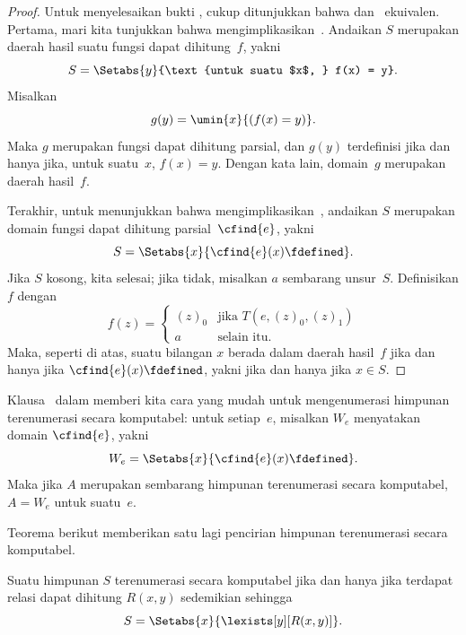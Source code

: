 \documentclass[../../../include/open-logic-section]{subfiles}
\begin{document}
\begin{proof}
Untuk menyelesaikan bukti , cukup ditunjukkan bahwa
 dan~ ekuivalen. Pertama, mari kita
tunjukkan bahwa  mengimplikasikan~.
Andaikan $S$ merupakan daerah hasil suatu fungsi dapat dihitung~$f$, yakni
\[
S = \Setabs{y}{\text{untuk suatu $x$, } f(x) = y}.
\]
Misalkan
\[
g(y) = \umin{x}{(f(x) = y)}.
\]
Maka $g$ merupakan fungsi dapat dihitung parsial, dan $g(y)$ terdefinisi jika
dan hanya jika, untuk suatu~$x$, $f(x) = y$. Dengan kata lain, domain~$g$
merupakan daerah hasil~$f$. 

Terakhir, untuk menunjukkan bahwa 
mengimplikasikan~, andaikan $S$ merupakan domain fungsi dapat
dihitung parsial~$\cfind{e}$, yakni
\[
S = \Setabs{x}{\cfind{e}(x) \fdefined}.
\]
Jika $S$ kosong, kita selesai; jika tidak, misalkan $a$ sembarang unsur~$S$.
Definisikan $f$ dengan
\[
f(z) = \begin{cases}
(z)_0 & \text{jika $T(e,(z)_0,(z)_1)$} \\
a & \text{selain itu.}
\end{cases}
\]
Maka, seperti di atas, suatu bilangan $x$ berada dalam daerah hasil~$f$ jika
dan hanya jika $\cfind{e}(x) \fdefined$, yakni jika dan hanya jika $x \in S$.
\end{proof}

Klausa~ dalam  memberi kita cara yang
mudah untuk mengenumerasi himpunan terenumerasi secara komputabel: untuk
setiap~$e$, misalkan $W_e$ menyatakan domain $\cfind{e}$, yakni
\[
W_e = \Setabs{x}{\cfind{e}(x) \fdefined}.
\]
Maka jika $A$ merupakan sembarang himpunan terenumerasi secara komputabel,
$A = W_e$ untuk suatu~$e$.

Teorema berikut memberikan satu lagi pencirian himpunan terenumerasi secara
komputabel.

\begin{thm}
Suatu himpunan $S$ terenumerasi secara komputabel jika dan hanya jika terdapat
relasi dapat dihitung $R(x,y)$ sedemikian sehingga
\[
S = \Setabs{ x }{ \lexists[y][R(x,y)] }.
\]
\end{thm}
\end{document}
